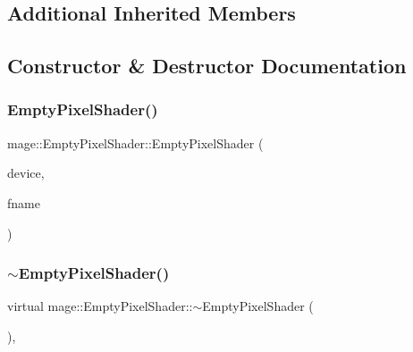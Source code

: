 \subsection*{Additional Inherited Members}


\subsection{Constructor \& Destructor Documentation}
\hypertarget{classmage_1_1_empty_pixel_shader_a261460a727f3cc27f16ac6b746d1b4a2}{}\label{classmage_1_1_empty_pixel_shader_a261460a727f3cc27f16ac6b746d1b4a2} 
\subsubsection{\texorpdfstring{Empty\+Pixel\+Shader()}{EmptyPixelShader()}\hspace{0.1cm}{\footnotesize\ttfamily [1/2]}}
{\footnotesize\ttfamily mage\+::\+Empty\+Pixel\+Shader\+::\+Empty\+Pixel\+Shader (\begin{DoxyParamCaption}\item[{\hyperlink{namespacemage_ae74f374780900893caa5555d1031fd79}{Com\+Ptr}$<$ I\+D3\+D11\+Device2 $>$}]{device,  }\item[{const wstring \&}]{fname }\end{DoxyParamCaption})}

\hypertarget{classmage_1_1_empty_pixel_shader_ace5053e12d6fa60caa2bcca00d192fab}{}\label{classmage_1_1_empty_pixel_shader_ace5053e12d6fa60caa2bcca00d192fab} 
\subsubsection{\texorpdfstring{$\sim$\+Empty\+Pixel\+Shader()}{~EmptyPixelShader()}}
{\footnotesize\ttfamily virtual mage\+::\+Empty\+Pixel\+Shader\+::$\sim$\+Empty\+Pixel\+Shader (\begin{DoxyParamCaption}{ }\end{DoxyParamCaption})\hspace{0.3cm}{\ttfamily [virtual]}, {\ttfamily [default]}}

